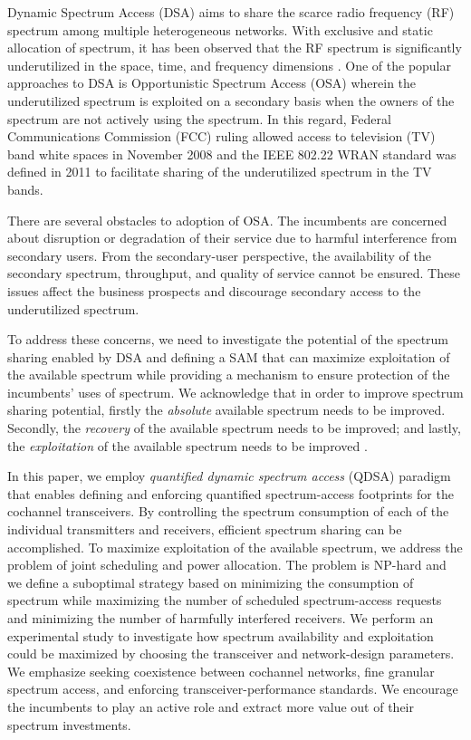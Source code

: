 \documentclass[12pt, draftclsnofoot, onecolumn]{IEEEtran}
\begin{document}
Dynamic Spectrum Access (DSA) \cite{dsa_survey} aims to share the scarce radio frequency (RF) spectrum among multiple heterogeneous networks. With exclusive and static allocation of spectrum, it has been observed that the RF spectrum is significantly underutilized in the space, time, and frequency dimensions \cite{fcc_sptf}. One of the popular approaches to DSA is Opportunistic Spectrum Access (OSA) wherein the underutilized spectrum is exploited on a secondary basis when the owners of the spectrum are not actively using the spectrum. In this regard, Federal Communications Commission (FCC) ruling allowed access to television (TV) band white spaces in November 2008 \cite{fcc_2008} and the IEEE 802.22 WRAN standard was defined in 2011 to facilitate sharing of the underutilized spectrum in the TV bands.

There are several obstacles to adoption of OSA. The incumbents are concerned about disruption or degradation of their service due to harmful interference from secondary users. From the secondary-user perspective, the availability of the secondary spectrum, throughput, and quality of service cannot be ensured. These issues affect the business prospects and discourage secondary access to the underutilized spectrum. 

To address these concerns, we need to investigate the potential of the spectrum sharing enabled by DSA and defining a SAM that can maximize exploitation of the available spectrum while providing a mechanism to ensure protection of the incumbents' uses of spectrum. We acknowledge that in order to improve spectrum sharing potential, firstly the \textit{absolute} available spectrum needs to be improved. Secondly, the \textit{recovery} of the available spectrum needs to be improved; and lastly, the \textit{exploitation} of the available spectrum needs to be improved \cite{oms_db}. 

In this paper, we employ \textit{quantified dynamic spectrum access} (QDSA) paradigm that enables defining and enforcing quantified spectrum-access footprints for the cochannel transceivers. By controlling the spectrum consumption of each of the individual transmitters and receivers, efficient spectrum sharing can be accomplished. To maximize exploitation of the available spectrum, we address the problem of joint scheduling and power allocation. The problem is NP-hard and we define a suboptimal strategy based on minimizing the consumption of spectrum while maximizing the number of scheduled spectrum-access requests and minimizing the number of harmfully interfered receivers. We perform an experimental study to investigate how spectrum availability and exploitation could be maximized by choosing the transceiver and network-design parameters. We emphasize seeking coexistence between cochannel networks, fine granular spectrum access, and enforcing transceiver-performance standards. We encourage the incumbents to play an active role and extract more value out of their spectrum investments. 
 
\end{document}
